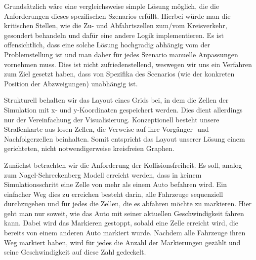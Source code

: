 \documentclass[10pt, a4paper]{article}
\begin{document}
Grundsätzlich wäre eine vergleichsweise simple Lösung möglich, die die Anforderungen dieses spezifischen Szenarios erfüllt. Hierbei würde man die kritischen Stellen, wie die Zu- und Abfahrtszellen zum/vom Kreisverkehr, gesondert behandeln und dafür eine andere Logik implementieren. Es ist offensichtlich, dass eine solche Lösung hochgradig abhängig vom der Problemstellung ist und man daher für jedes Szenario manuelle Anpassungen vornehmen muss. Dies ist nicht zufriedenstellend, weswegen wir uns ein Verfahren zum Ziel gesetzt haben, dass von Spezifika des Scenarios (wie der konkreten Position der Abzweigungen) unabhängig ist.

Strukturell behalten wir das Layout eines Grids bei, in dem die Zellen der Simulation mit x- und y-Koordinaten gespeichert werden. Dies dient allerdings nur der Vereinfachung der Visualisierung. Konzeptionell besteht unsere Straßenkarte aus losen Zellen, die Verweise auf ihre Vorgänger- und Nachfolgerzellen beinhalten. Somit entspricht das Layout unserer Lösung einem gerichteten, nicht notwendigerweise kreisfreien Graphen.

Zunächst betrachten wir die Anforderung der Kollisionsfreiheit. Es soll, analog zum Nagel-Schreckenberg Modell \cite{nagel-schreckenberg} erreicht werden, dass in keinem Simulationsschritt eine Zelle von mehr als einem Auto befahren wird. Ein einfacher Weg dies zu erreichen besteht darin, alle Fahrzeuge sequenziell durchzugehen und für jedes die Zellen, die es abfahren möchte zu markieren. Hier geht man nur soweit, wie das Auto mit seiner aktuellen Geschwindigkeit fahren kann. Dabei wird das Markieren gestoppt, sobald eine Zelle erreicht wird, die bereits von einem anderen Auto markiert wurde. Nachdem alle Fahrzeuge ihren Weg markiert haben, wird für jedes die Anzahl der Markierungen gezählt und seine Geschwindigkeit auf diese Zahl gedeckelt.
\end{document}
